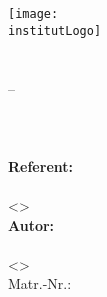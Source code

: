 
\begin{titlepage}

  \begin{center}
    \sffamily

    \texttt{[image: \\institutLogo]}\\[4ex]

    \huge{\institutName}\\[1ex]
    \LARGE{\fakultaet}\\[1ex]
    \Large{{\studiengang} -- \studiengangKuerzel}\\[50pt]

    \huge{\textbf{\titel}}\\[3ex]
    \Large{\textbf{\untertitel}}\\[1ex]
    \Large{\untertitelEnglisch}\\[50pt]

    \large
    \textbf{Referent:}\\
    \\
    <>\\[3ex]

    \textbf{Autor:}\\
    \autorName\\
    <\autorEmail>\\
    Matr.-Nr.: \autorMatnr\\[50pt]

    \zeitstempel

    \rmfamily
  \end{center}

\end{titlepage}
